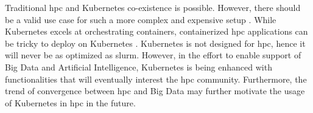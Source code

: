 \documentclass[12pt]{article}
\begin{document}
Traditional \gls{hpc} and Kubernetes co-existence is possible. However, there should be a valid use case for such a more complex and expensive setup \cite{cloudy-hutch}. While Kubernetes excels at orchestrating containers, containerized \gls{hpc} applications can be tricky to deploy on Kubernetes \cite{kubenetes-blog-meets-hpc}. Kubernetes is not designed for \gls{hpc}, hence it will never be as optimized as \gls{slurm}. However, in the effort to enable support of Big Data and Artificial Intelligence, Kubernetes is being enhanced with functionalities that will eventually interest the \gls{hpc} community. Furthermore, the trend of convergence between \gls{hpc} and Big Data may further motivate the usage of Kubernetes in \gls{hpc} in the future.





\end{document}
